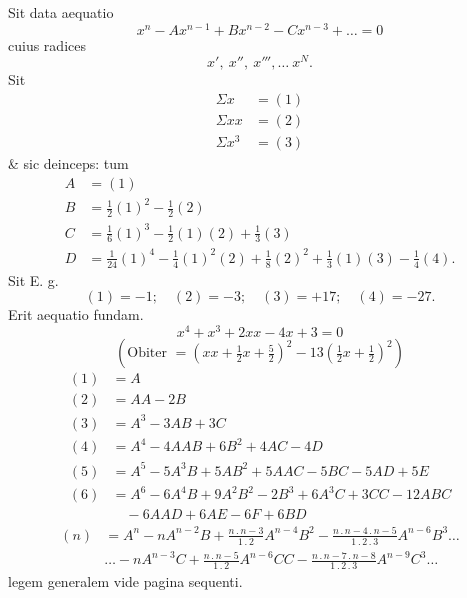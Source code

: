 \NoSourceHead
{}
\noindent\hspace*{\parindent}Sit data aequatio
\[x^n-Ax^{n-1}+Bx^{n-2}-Cx^{n-3}+\ldots=0\]
\noindent cuius radices
\[x',\ x'',\ x''',\ldots\ x^N.\]
\noindent\hspace*{\parindent}Sit
\[\begin{aligned}
\Sigma x&=(1)\\
\Sigma xx&=(2)\\
\Sigma x^3&=(3)
\end{aligned}\]
\noindent\& sic deinceps: tum
\[\begin{aligned}
A&=(1)\\
B&=\tfrac12(1)^2-\tfrac12(2)\\
C&=\tfrac16(1)^3-\tfrac12(1)(2)+\tfrac13(3)\\
D&=\tfrac1{24}(1)^4-\tfrac14(1)^2(2)+\tfrac18(2)^2+\tfrac13(1)(3)-\tfrac14(4).
\end{aligned}\]
\noindent\hspace*{\parindent}Sit E. g.
\[(1)=-1;\quad(2)=-3;\quad(3)=+17;\quad(4)=-27.\]
\clearpage
{}
\noindent Erit aequatio fundam.
\[x^4+x^3+2xx-4x+3=0\]
\[(\text{Obiter }=(xx+\tfrac12x+\tfrac52)^2-13(\tfrac12x+\tfrac12)^2)\]
\[\begin{aligned}
(1)&=A\\
(2)&=AA-2B\\
(3)&=A^3-3AB+3C\\
(4)&=A^4-4AAB+6B^2+4AC-4D\\
(5)&=A^5-5A^3B+5AB^2+5AAC-5BC-5AD+5E\\
(6)&=A^6-6A^4B+9A^2B^2-2B^3+6A^3C+3CC-12ABC\\
&\quad{}-6AAD+6AE-6F+6BD
\end{aligned}\]
\[\begin{aligned}
(n)&=A^n-nA^{n-2}B+\frac{n\mathpunct{.}n-3}{1\mathpunct{.}2}A^{n-4}B^2
-\frac{n\mathpunct{.}n-4\mathpunct{.}n-5}{1\mathpunct{.}2\mathpunct{.}3}A^{n-6}B^3\ldots\\[6pt]
&\ldots-nA^{n-3}C+\frac{n\mathpunct{.}n-5}{1\mathpunct{.}2}A^{n-6}CC
-\frac{n\mathpunct{.}n-7\mathpunct{.}n-8}{1\mathpunct{.}2\mathpunct{.}3}A^{n-9}C^3\ldots
\end{aligned}\]
\noindent legem generalem vide pagina sequenti.

